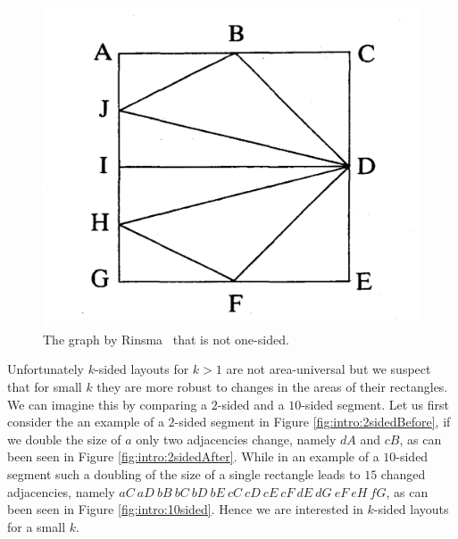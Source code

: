   \begin{figure}[!t]
    \centering
    \includegraphics[scale=.15]{introduction/img/rinsma.png}
    \caption{The graph by Rinsma~\cite{Rinsma1987} that is not one-sided.}
    \label{fig:intro:rinsma}
  \end{figure}

  Unfortunately $k$-sided layouts for $k>1$ are not area-universal but we suspect that for small $k$ they are more robust to changes in the areas of their rectangles.
  We can imagine this by comparing a $2$-sided and a $10$-sided segment. Let us first consider the an example of a $2$-sided segment in Figure \ref{fig:intro:2sidedBefore},  if we double the size of $a$ only two adjacencies change, namely $dA$ and $cB$, as can been seen in Figure \ref{fig:intro:2sidedAfter}.
  While in an example of a $10$-sided segment such a doubling of the size of a single rectangle leads to $15$ changed adjacencies, namely $aC\ aD\ bB\ bC\ bD\ bE\ cC\ cD\ cE\ cF\ dE\ dG\ eF\ eH\ fG$, as can been seen in Figure \ref{fig:intro:10sided}. Hence we are interested in $k$-sided layouts for a small $k$.


